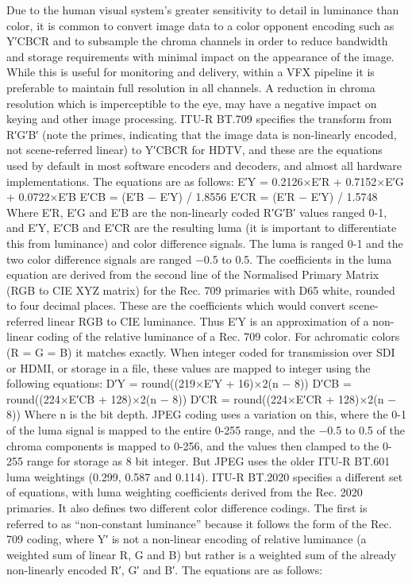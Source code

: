 Due to the human visual system’s greater sensitivity to detail in luminance than color, it is common to convert image data to a color opponent encoding such as Y′CBCR and to subsample the chroma channels in order to reduce bandwidth and storage requirements with minimal impact on the appearance of the image. While this is useful for monitoring and delivery, within a VFX pipeline it is preferable to maintain full resolution in all channels. A reduction in chroma resolution which is imperceptible to the eye, may have a negative impact on keying and other image processing.
ITU-R BT.709 specifies the transform from R′G′B′ (note the primes, indicating that the image data is non-linearly encoded, not scene-referred linear) to Y′CBCR for HDTV, and these are the equations used by default in most software encoders and decoders, and almost all hardware implementations. The equations are as follows:
	E′Y = 0.2126×E′R + 0.7152×E′G + 0.0722×E′B
	E′CB =  (E′B − E′Y) / 1.8556
	E′CR =  (E′R − E′Y) / 1.5748
Where E′R, E′G and E′B are the non-linearly coded R′G′B′ values ranged 0-1, and E′Y, E′CB and E′CR are the resulting luma (it is important to differentiate this from luminance) and color difference signals. The luma is ranged 0-1 and the two color difference signals are ranged −0.5 to 0.5.
The coefficients in the luma equation are derived from the second line of the Normalised Primary Matrix (RGB to CIE XYZ matrix) for the Rec. 709 primaries with D65 white, rounded to four decimal places. These are the coefficients which would convert scene-referred linear RGB to CIE luminance. Thus E′Y is an approximation of a non-linear coding of the relative luminance of a Rec. 709 color. For achromatic colors (R = G = B) it matches exactly.
When integer coded for transmission over SDI or HDMI, or storage in a file, these values are mapped to integer using the following equations:
	D′Y = round((219×E′Y + 16)×2(n − 8))
	D′CB = round((224×E′CB + 128)×2(n − 8))
	D′CR = round((224×E′CR + 128)×2(n − 8))
Where n is the bit depth.
JPEG coding uses a variation on this, where the 0-1 of the luma signal is mapped to the entire 0-255 range, and the −0.5 to 0.5 of the chroma components is mapped to 0-256, and the values then clamped to the 0-255 range for storage as 8 bit integer. But JPEG uses the older ITU-R BT.601 luma weightings (0.299, 0.587 and 0.114).
ITU-R BT.2020 specifies a different set of equations, with luma weighting coefficients derived from the Rec. 2020 primaries. It also defines two different color difference codings.
The first is referred to as “non-constant luminance” because it follows the form of the Rec. 709 coding, where Y′ is not a non-linear encoding of relative luminance (a weighted sum of linear R, G and B) but rather is a weighted sum of the already non-linearly encoded R′, G′ and B′. The equations are as follows:
